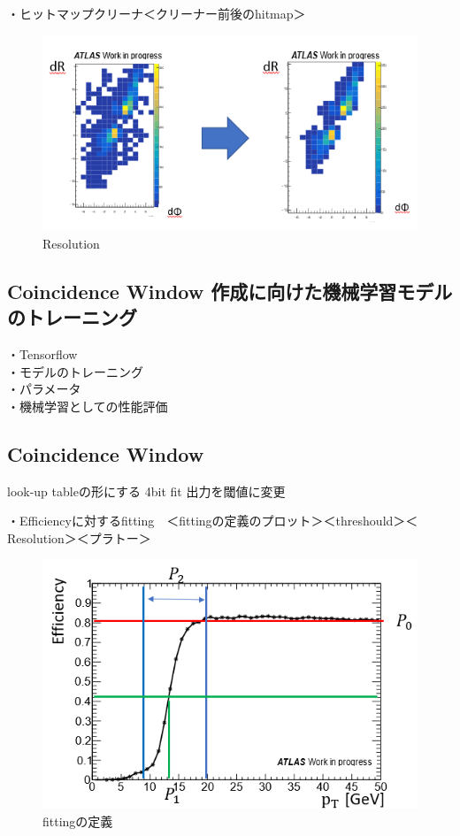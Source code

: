 ・ヒットマップクリーナ＜クリーナー前後のhitmap＞
\begin{figure}[tb]
  \centering
  \includegraphics[clip, width=14cm]{fig/4/cleaner.png}
  \caption{Resolution}
  \label{fig:Resolution}
\end{figure}


\subsection{Coincidence Window 作成に向けた機械学習モデルのトレーニング}
・Tensorflow\\
・モデルのトレーニング\\
・パラメータ\\
・機械学習としての性能評価

\subsection{Coincidence Window}
look-up tableの形にする
4bit
fit
出力を閾値に変更

・Efficiencyに対するfitting　＜fittingの定義のプロット＞＜threshould＞＜Resolution＞＜プラトー＞\\
\begin{figure}[tb]
  \centering
  \includegraphics[clip, width=14cm]{fig/4/fitting_def.png}
  \caption{fittingの定義}
  \label{fig:fit_def}
\end{figure}

